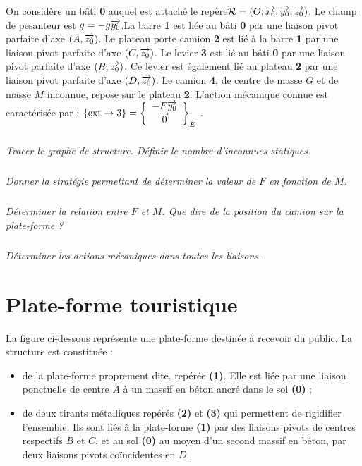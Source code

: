 \documentclass[10pt,fleqn]{article} %
\begin{document}
\begin{multicols}{2}
\setcounter{exo}{0}
On considère un bâti \textbf{0} auquel est attaché le repère$\mathcal{R}=\left(O;\overrightarrow{x_0};\overrightarrow{y_0};\overrightarrow{z_0} \right)$. Le champ de pesanteur est $g=-g\overrightarrow{y_0}$.La barre \textbf{1} est liée au bâti \textbf{0} par une liaison pivot parfaite d’axe $\left(A,\overrightarrow{z_0}\right)$. Le plateau porte camion \textbf{2} est lié à la barre \textbf{1} par une liaison pivot parfaite d’axe $\left(C,\overrightarrow{z_0}\right)$. Le levier \textbf{3} est lié au bâti \textbf{0} par une liaison pivot parfaite d’axe $\left(B,\overrightarrow{z_0}\right)$. Ce levier est également lié au plateau \textbf{2} par une liaison pivot parfaite d’axe $\left(D,\overrightarrow{z_0}\right)$. Le camion \textbf{4}, de centre de masse $G$ et de masse $M$ inconnue, repose sur le plateau \textbf{2}.
L’action mécanique connue est caractérisée par : $\{\text{ext}\rightarrow 3\}=\left\{
\begin{array}{c}
-F\overrightarrow{y_0} \\
\overrightarrow{0} \\
\end{array}
\right\}_E$ .




\subparagraph{}\textit{Tracer le graphe de structure. Définir le nombre d'inconnues statiques.}

\subparagraph{}\textit{Donner la stratégie permettant de déterminer la valeur de $F$ en fonction de $M$.}

\subparagraph{}\textit{Déterminer la relation entre $F$ et $M$. Que dire de la position du camion sur la plate-forme ?}

\subparagraph{}\textit{Déterminer les actions mécaniques dans toutes les liaisons.}


\section*{Plate-forme touristique}
\setcounter{exo}{0}

La figure ci-dessous représente une plate-forme destinée à recevoir du public. La structure est constituée :
\begin{itemize}
\item de la plate-forme proprement dite, repérée \textbf{(1)}. Elle est liée par une liaison ponctuelle de centre $A$ à un massif en béton ancré dans le sol \textbf{(0)} ;
\item de deux tirants métalliques repérés \textbf{(2)} et \textbf{(3)} qui permettent de rigidifier l’ensemble. Ils sont liés à la plate-forme \textbf{(1)} par des liaisons pivots de centres respectifs $B$ et $C$, et au sol \textbf{(0)} au moyen d’un second massif en béton, par deux liaisons pivots coïncidentes en $D$.
\end{itemize}


\end{multicols}
\end{document}
